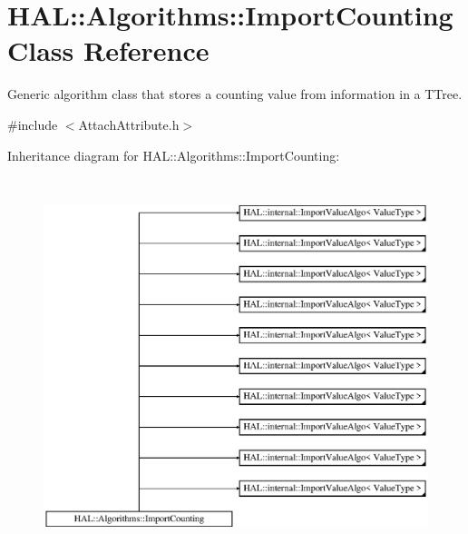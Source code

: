 \hypertarget{class_h_a_l_1_1_algorithms_1_1_import_counting}{\section{H\+A\+L\+:\+:Algorithms\+:\+:Import\+Counting Class Reference}
\label{class_h_a_l_1_1_algorithms_1_1_import_counting}
}


Generic algorithm class that stores a counting value from information in a T\+Tree.  




{\ttfamily \#include $<$Attach\+Attribute.\+h$>$}

Inheritance diagram for H\+A\+L\+:\+:Algorithms\+:\+:Import\+Counting\+:\begin{figure}[H]
\begin{center}
\leavevmode
\includegraphics[height=11.000000cm]{class_h_a_l_1_1_algorithms_1_1_import_counting}
\end{center}
\end{figure}
